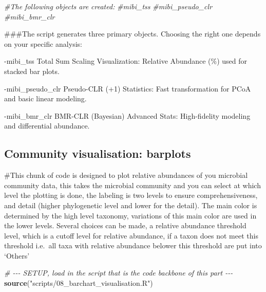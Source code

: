 \documentclass[
]{article}
\newenvironment{Shaded}{\begin{snugshade}}{\end{snugshade}}
\newcommand{\CommentTok}[1]{\textcolor[rgb]{0.56,0.35,0.01}{\textit{#1}}}
\newcommand{\FunctionTok}[1]{\textcolor[rgb]{0.13,0.29,0.53}{\textbf{#1}}}
\newcommand{\NormalTok}[1]{#1}
\newcommand{\StringTok}[1]{\textcolor[rgb]{0.31,0.60,0.02}{#1}}
\begin{document}
\begin{Shaded}
\begin{Highlighting}[]
\CommentTok{\#The following objects are created:}
\CommentTok{\#mibi\_tss}
\CommentTok{\#mibi\_pseudo\_clr}
\CommentTok{\#mibi\_bmr\_clr}
\end{Highlighting}
\end{Shaded}

\#\#\#The script generates three primary objects. Choosing the right one
depends on your specific analysis:

-mibi\_tss Total Sum Scaling Visualization: Relative Abundance (\%) used
for stacked bar plots.

-mibi\_pseudo\_clr Pseudo-CLR (+1) Statistics: Fast transformation for
PCoA and basic linear modeling.

-mibi\_bmr\_clr BMR-CLR (Bayesian) Advanced Stats: High-fidelity
modeling and differential abundance.

\subsection{Community visualisation:
barplots}\label{community-visualisation-barplots}

\#This chunk of code is designed to plot relative abundances of you
microbial community data, this takes the microbial community and you can
select at which level the plotting is done, the labeling is two levels
to ensure comprehensiveness, and detail (higher phylogenetic level and
lower for the detail). The main color is determined by the high level
taxonomy, variations of this main color are used in the lower levels.
Several choices can be made, a relative abundance threshold level, which
is a cutoff level for relative abundance, if a taxon does not meet this
threshold i.e.~all taxa with relative abundance belower this threshold
are put into `Others'

\begin{Shaded}
\begin{Highlighting}[]
\CommentTok{\# {-}{-}{-} SETUP, load in the script that is the code backbone of this part {-}{-}{-}}
\FunctionTok{source}\NormalTok{(}\StringTok{"scripts/08\_barchart\_visualisation.R"}\NormalTok{)}
\end{Highlighting}
\end{Shaded}
\end{document}

